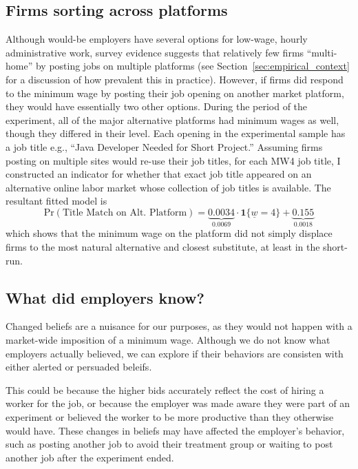 \documentclass[AER]{AEA}
\begin{document}
\subsection{Firms sorting across platforms} \label{ref:firms_sorting_platforms}
Although would-be employers have several options for low-wage, hourly administrative work, survey evidence suggests that relatively few firms ``multi-home'' by posting jobs on multiple platforms (see Section~\ref{sec:empirical_context} for a discussion of how prevalent this in practice). 
However, if firms did respond to the minimum wage by posting their job opening on another market platform, they would have essentially two other options. 
During the period of the experiment, all of the major alternative platforms had minimum wages as well, though they differed in their level. 
Each opening in the experimental sample has a job title e.g., ``Java Developer Needed for Short Project.'' 
Assuming firms posting on multiple sites would re-use their job titles, for each MW4 job title, I constructed an indicator for whether that exact job title appeared on an alternative online labor market whose collection of job titles is available. 
The resultant fitted model is 
\begin{equation} \label{eq:alt_platform} 
\mbox{Pr}\left(\mbox{Title Match on Alt. Platform}\right) = 
\underbrace{0.0034}_{0.0069} \cdot \mathbf{1}\{ \underline{w} = 4\} + \underbrace{0.155}_{0.0018}  
\end{equation} 
which shows that the minimum wage on the platform did not simply displace firms to the most natural alternative and closest substitute, at least in the short-run. 


\subsection{What did employers know?} \label{sec:what_did_employers_know}

Changed beliefs are a nuisance for our purposes, as they would not happen with a market-wide imposition of a minimum wage.
Although we do not know what employers actually believed, we can explore if their behaviors are consisten with either alerted or persuaded beleifs. 

This could be because the higher bids accurately reflect the cost of hiring a worker for the job, or because the employer was made aware they were part of an experiment or believed the worker to be more productive than they otherwise would have.
These changes in beliefs may have affected the employer's behavior, such as posting another job to avoid their treatment group or waiting to post another job after the experiment ended.
\end{document}
